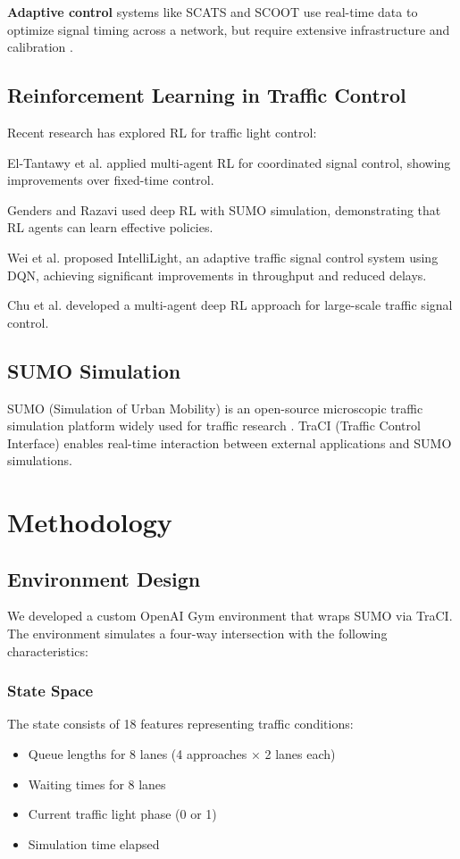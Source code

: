 \documentclass[conference]{IEEEtran}
\begin{document}
\textbf{Adaptive control} systems like SCATS and SCOOT use real-time data to optimize signal timing across a network, but require extensive infrastructure and calibration \cite{lowrie1990scoot}.

\subsection{Reinforcement Learning in Traffic Control}
Recent research has explored RL for traffic light control:

El-Tantawy et al. \cite{el2013multiagent} applied multi-agent RL for coordinated signal control, showing improvements over fixed-time control.

Genders and Razavi \cite{genders2016using} used deep RL with SUMO simulation, demonstrating that RL agents can learn effective policies.

Wei et al. \cite{wei2018intellilight} proposed IntelliLight, an adaptive traffic signal control system using DQN, achieving significant improvements in throughput and reduced delays.

Chu et al. \cite{chu2019multi} developed a multi-agent deep RL approach for large-scale traffic signal control.

\subsection{SUMO Simulation}
SUMO (Simulation of Urban Mobility) is an open-source microscopic traffic simulation platform widely used for traffic research \cite{sumo2018}. TraCI (Traffic Control Interface) enables real-time interaction between external applications and SUMO simulations.

\section{Methodology}
\label{sec:methodology}

\subsection{Environment Design}
We developed a custom OpenAI Gym environment that wraps SUMO via TraCI. The environment simulates a four-way intersection with the following characteristics:

\subsubsection{State Space}
The state consists of 18 features representing traffic conditions:
\begin{itemize}
\item Queue lengths for 8 lanes (4 approaches × 2 lanes each)
\item Waiting times for 8 lanes
\item Current traffic light phase (0 or 1)
\item Simulation time elapsed
\end{itemize}
\end{document}
